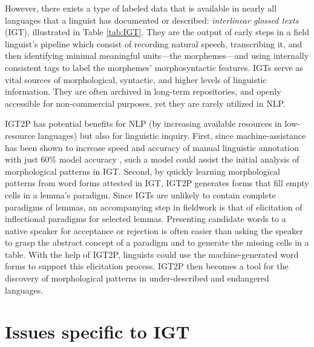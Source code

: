 However, there exists a type of labeled data that is available in nearly all languages that a linguist has documented or described: \textit{interlinear glossed texts} (IGT), illustrated in Table \ref{tab:IGT}. They are the output of early steps in a field linguist's pipeline which consist of recording natural speech, transcribing it, and then identifying minimal meaningful units---the morphemes---and using internally consistent tags to label the morphemes' morphosyntactic features. IGTs serve as vital sources of morphological, syntactic, and higher levels of linguistic information. They are often archived in long-term repositories, and openly accessible for non-commercial purposes, yet they are rarely utilized in NLP.

IGT2P has potential benefits for NLP (by increasing available resources in low-resource languages) but also for linguistic inquiry. First, since machine-assistance has been shown to increase speed and accuracy of manual linguistic annotation with just 60\% model accuracy \citep{felt_improving_2012}, such a model could assist the initial analysis of morphological patterns in IGT. Second, by quickly learning morphological patterns from word forms attested in IGT, IGT2P generates forms that fill empty cells in a lemma's paradigm. Since IGTs are unlikely to contain complete paradigms of lemmas, an accompanying step in fieldwork is that of elicitation of inflectional paradigms for selected lemmas. Presenting candidate words to a native speaker for acceptance or rejection is often easier than asking the speaker to grasp the abstract concept of a paradigm and to generate the missing cells in a table. With the help of IGT2P, linguists could use the machine-generated word forms to support this elicitation process. IGT2P then becomes a tool for the discovery of morphological patterns in under-described and endangered languages.



\section{Issues specific to IGT}
\label{sec:issues}

